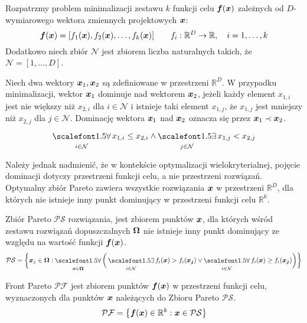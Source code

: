 Rozpatrzmy problem minimalizacji zestawu $k$ funkcji celu $\bm{f}(\bm{x})$ zależnych od $D$-wymiarowego wektora zmiennych projektowych $\bm{x}$:
\begin{equation}
	\bm{f}(\bm{x})=[f_1(\bm{x}),f_2(\bm{x}),\dots,f_k(\bm{x})] \qquad f_i:\mathbb{R}^D\rightarrow \mathbb{R},\quad i=1,\dots,k
\end{equation}
Dodatkowo niech zbiór $\mathcal{N}$ jest zbiorem liczba naturalnych takich, że $\mathcal{N}=[1,\dots,D]$.
\begin{definition}
Niech dwa wektory $\bm{x}_1, \bm{x}_2$ są zdefiniowane w przestrzeni $\mathbb{R}^D$. W przypadku minimalizacji, wektor $\bm{x}_1$ dominuje nad wektorem $\bm{x}_2$, jeżeli każdy element $x_{1,i}$ jest nie większy niż $x_{2,i}$ dla $i\in \mathcal{N}$ i istnieje taki element $x_{1,j}$, że $x_{1,j}$ jest mniejszy niż $x_{2,j}$ dla $j\in\mathcal{N}$. Dominację wektora $\bm{x}_1$ nad $\bm{x}_2$ oznacza się przez $\bm{x}_1\prec\bm{x}_2$.
\begin{equation}
	\bigforall_{i\in\mathcal{N}} x_{1,i}\le x_{2,i} \land \bigexists_{j\in\mathcal{N}} x_{1,j}<x_{2,j}
\end{equation}
\end{definition}


Należy jednak nadmienić, że w kontekście optymalizacji wielokryterialnej, pojęcie dominacji dotyczy przestrzeni funkcji celu, a nie przestrzeni rozwiązań. Optymalny zbiór Pareto zawiera wszystkie rozwiązania $\bm{x}$ w przestrzeni $\mathbb{R}^D$, dla których nie istnieje inny punkt dominujący w przestrzeni funkcji celu $\mathbb{R}^k$.

\begin{definition}
	Zbiór Pareto $\mathcal{PS}$ rozwiązania, jest zbiorem punktów $\bm{x}$, dla których wśród zestawu rozwiązań dopuszczalnych $\bm{\Omega}$ nie istnieje inny punkt dominujący ze względu na wartość funkcji $\bm{f}(\bm{x})$.
	\begin{equation}
		\mathcal{PS} = \bigg\{ 
		\vect{x}_j \in \vect{\Omega}: 
		\bigforall_{\vect{x}\in\vect{\Omega}} \bigg( 
		\bigexists_{i\in\mathcal{N}} f_i(\vect{x})>f_i(\vect{x_j}) \vee
		\bigforall_{i\in\mathcal{N}} f_i(\vect{x})\ge f_i(\vect{x_j})
		\bigg) \bigg\}   
	\end{equation}
\end{definition}
\begin{definition}
	Front Pareto $\mathcal{PF}$ jest zbiorem punktów $\bm{f}(\bm{x})$ w przestrzeni funkcji celu, wyznaczonych dla punktów $\bm{x}$ należących do Zbioru Pareto $\mathcal{PS}$.
	\begin{equation}
		\mathcal{PF} = \big\{ \bm{f}(\bm{x}) \in \mathbb{R}^k: \bm{x}\in \mathcal{PS} \big\}  
	\end{equation}
\end{definition}

